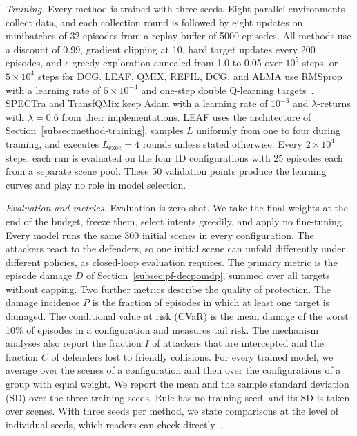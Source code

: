 \emph{Training.} Every method is trained with three seeds. Eight parallel environments collect data, and each collection round is followed by eight updates on minibatches of 32 episodes from a replay buffer of 5000 episodes. All methods use a discount of 0.99, gradient clipping at 10, hard target updates every 200 episodes, and $\epsilon$-greedy exploration annealed from 1.0 to 0.05 over $10^5$ steps, or $5\times10^4$ steps for DCG. LEAF, QMIX, REFIL, DCG, and ALMA use RMSprop with a learning rate of $5\times10^{-4}$ and one-step double Q-learning targets~\cite{vanhasselt2016double}. SPECTra and TransfQMix keep Adam with a learning rate of $10^{-3}$ and $\lambda$-returns with $\lambda=0.6$ from their implementations. LEAF uses the architecture of Section~\ref{subsec:method-training}, samples $L$ uniformly from one to four during training, and executes $L_{\mathrm{exec}}=4$ rounds unless stated otherwise. Every $2\times10^4$ steps, each run is evaluated on the four ID configurations with 25 episodes each from a separate scene pool. These 50 validation points produce the learning curves and play no role in model selection.

\emph{Evaluation and metrics.} Evaluation is zero-shot. We take the final weights at the end of the budget, freeze them, select intents greedily, and apply no fine-tuning. Every model runs the same 300 initial scenes in every configuration. The attackers react to the defenders, so one initial scene can unfold differently under different policies, as closed-loop evaluation requires. The primary metric is the episode damage $D$ of Section~\ref{subsec:pf-decpomdp}, summed over all targets without capping. Two further metrics describe the quality of protection. The damage incidence $P$ is the fraction of episodes in which at least one target is damaged. The conditional value at risk (CVaR) is the mean damage of the worst 10\% of episodes in a configuration and measures tail risk. The mechanism analyses also report the fraction $I$ of attackers that are intercepted and the fraction $C$ of defenders lost to friendly collisions. For every trained model, we average over the scenes of a configuration and then over the configurations of a group with equal weight. We report the mean and the sample standard deviation (SD) over the three training seeds. Rule has no training seed, and its SD is taken over scenes. With three seeds per method, we state comparisons at the level of individual seeds, which readers can check directly~\cite{agarwal2021rliable}.

